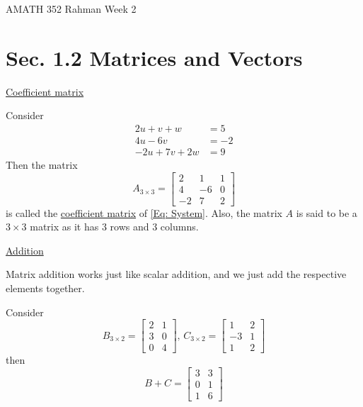 \documentclass[reqno]{amsart}
\theoremstyle{definition}
\begin{document}
\begin{flushleft}
{\sc \Large AMATH 352 Rahman} \hfill Week 2
\bigskip
\end{flushleft}

\newcommand{\R}{\mathbb{R}}
\newcommand{\N}{\mathbb{N}}
\newcommand{\Z}{\mathbb{Z}}
\newcommand{\Q}{\mathbb{Q}}
\renewcommand{\CancelColor}{\color{red}}
\newcommand{\?}{\stackrel{?}{=}}
\renewcommand{\varphi}{\phi}
\newcommand{\card}{\text{Card}}
\newcommand{\bigzero}{\text{\Huge 0}}



\section*{Sec. 1.2 Matrices and Vectors}

\underline{Coefficient matrix}

Consider
%
\begin{equation}
\begin{split}
2u + v + w &= 5\\
4u - 6v &= -2\\
-2u + 7v + 2w &= 9
\end{split}
\label{Eq: System}
\end{equation}
%
Then the matrix
%
\begin{equation*}
A_{3\times 3} = \begin{bmatrix}
2 & 1 & 1\\
4 & -6 & 0\\
-2 & 7 & 2
\end{bmatrix}
\end{equation*}
%
is called the \underline{coefficient matrix} of \eqref{Eq: System}.  Also, the matrix $A$ is said to be
a $3\times 3$ matrix as it has $3$ rows and $3$ columns.

\bigskip

\underline{Addition}

Matrix addition works just like scalar addition, and we just add the respective elements together.

Consider
%
\begin{equation*}
B_{3 \times 2} = \begin{bmatrix}
2 & 1\\
3 & 0\\
0 & 4
\end{bmatrix},\,
C_{3 \times 2} = \begin{bmatrix}
1 & 2\\
-3 & 1\\
1 & 2
\end{bmatrix}
\end{equation*}
%
then
%
\begin{equation*}
B + C = \begin{bmatrix}
3 & 3\\
0 & 1\\
1 & 6
\end{bmatrix}
\end{equation*}
\end{document}
